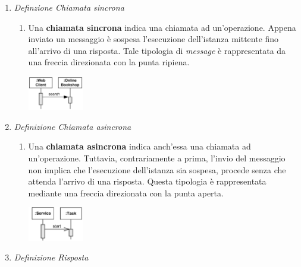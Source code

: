 \documentclass{article}
\begin{document}
\begin{enumerate}
    \renewcommand{\labelenumi}{-}
    \itemsep0em
    \item \textit{Definzione Chiamata sincrona} \begin{enumerate}[label={}]
                                \item Una \textbf{chiamata sincrona} indica una chiamata ad un'operazione. Appena inviato un messaggio è sospesa l'esecuzione dell'istanza mittente fino all'arrivo di una risposta. Tale tipologia di \textit{message} è rappresentata da una freccia direzionata con la punta ripiena.\vspace*{14pt}
                                    \begin{center}
                                        \includegraphics[width=0.2\textwidth]{foto 4.png}\\
                                    \end{center}
                            \end{enumerate}
    \item \textit{Definizione Chiamata asincrona} \begin{enumerate}[label={}]
                                \item Una \textbf{chiamata asincrona} indica anch'essa una chiamata ad un'operazione. Tuttavia, contrariamente a prima, l'invio del messaggio non implica che l'esecuzione dell'istanza sia sospesa, procede senza che attenda l'arrivo di una risposta. Questa tipologia è rappresentata mediante una freccia direzionata con la punta aperta.\vspace*{14pt}
                                    \begin{center}
                                        \includegraphics[width=0.2\textwidth]{foto 5.png}\\
                                    \end{center}
                            \end{enumerate}
    \item \textit{Definizione Risposta}  \begin{enumerate}[label={}]

\end{enumerate}
\end{enumerate}
\end{document}
